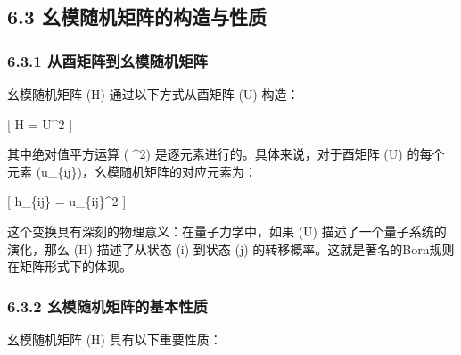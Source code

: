 \documentclass[
  12pt,
]{article}
\begin{document}
\hypertarget{ux5e7aux6a21ux968fux673aux77e9ux9635ux7684ux6784ux9020ux4e0eux6027ux8d28}{%
\subsection{6.3
幺模随机矩阵的构造与性质}\label{ux5e7aux6a21ux968fux673aux77e9ux9635ux7684ux6784ux9020ux4e0eux6027ux8d28}}

\hypertarget{ux4eceux9149ux77e9ux9635ux5230ux5e7aux6a21ux968fux673aux77e9ux9635-1}{%
\subsubsection{6.3.1
从酉矩阵到幺模随机矩阵}\label{ux4eceux9149ux77e9ux9635ux5230ux5e7aux6a21ux968fux673aux77e9ux9635-1}}

幺模随机矩阵 (H) 通过以下方式从酉矩阵 (U) 构造：

{[} H = \textbar U\textbar\^{}2 {]}

其中绝对值平方运算 (\textbar{} \cdot \textbar\^{}2)
是逐元素进行的。具体来说，对于酉矩阵 (U) 的每个元素
(u\_\{ij\})，幺模随机矩阵的对应元素为：

{[} h\_\{ij\} = \textbar u\_\{ij\}\textbar\^{}2 {]}

这个变换具有深刻的物理意义：在量子力学中，如果 (U)
描述了一个量子系统的演化，那么 (H) 描述了从状态 (i) 到状态 (j)
的转移概率。这就是著名的Born规则在矩阵形式下的体现。

\hypertarget{ux5e7aux6a21ux968fux673aux77e9ux9635ux7684ux57faux672cux6027ux8d28}{%
\subsubsection{6.3.2
幺模随机矩阵的基本性质}\label{ux5e7aux6a21ux968fux673aux77e9ux9635ux7684ux57faux672cux6027ux8d28}}

幺模随机矩阵 (H) 具有以下重要性质：
\end{document}
